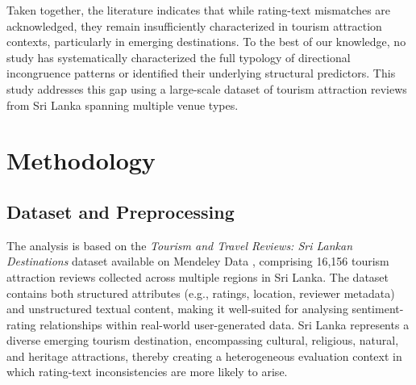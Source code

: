 \documentclass[conference]{IEEEtran}
\begin{document}
Taken together, the literature indicates that while rating-text mismatches are acknowledged, they remain insufficiently characterized in tourism attraction contexts, particularly in emerging destinations. To the best of our knowledge, no study has systematically characterized the full typology of directional incongruence patterns or identified their underlying structural predictors. This study addresses this gap using a large-scale dataset of tourism attraction reviews from Sri Lanka spanning multiple venue types.

\section{Methodology}
\subsection{Dataset and Preprocessing}
The analysis is based on the \textit{Tourism and Travel Reviews: Sri Lankan Destinations} dataset available on Mendeley Data \cite{sewwandi2023}, comprising 16,156 tourism attraction reviews collected across multiple regions in Sri Lanka. The dataset contains both structured attributes (e.g., ratings, location, reviewer metadata) and unstructured textual content, making it well-suited for analysing sentiment-rating relationships within real-world user-generated data. Sri Lanka represents a diverse emerging tourism destination, encompassing cultural, religious, natural, and heritage attractions, thereby creating a heterogeneous evaluation context in which rating-text inconsistencies are more likely to arise.
\end{document}
